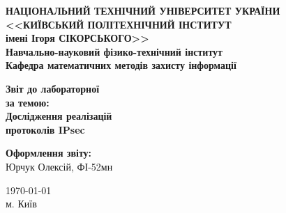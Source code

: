 \thispagestyle{empty}
\linespread{1.1}

\begin{center}
    {\bfseries\large
        НАЦІОНАЛЬНИЙ ТЕХНІЧНИЙ УНІВЕРСИТЕТ УКРАЇНИ \\
        <<КИЇВСЬКИЙ ПОЛІТЕХНІЧНИЙ ІНСТИТУТ \\
        імені Ігоря СІКОРСЬКОГО>> \\
        Навчально-науковий фізико-технічний інститут \\
        \medskip
        Кафедра математичних методів захисту інформації}
\end{center}

\begin{center}
\vspace{40mm}
{\bfseries\huge Звіт до лабораторної } \\
{\bfseries\Large за темою:} \\
{\bfseries\Large Дослідження реалізацій} \\
{\bfseries\Large протоколів IPsec} \\
\end{center}

\vspace{55mm}
\begin{center}
    \hfill
    \begin{minipage}[t]{0.4\textwidth}
        \begin{flushright}
            \textbf{Оформлення звіту:} \\
                Юрчук Олексій, ФІ-52мн \\
        \end{flushright}
    \end{minipage}
\end{center}

\vfill
\begin{center}
    \today \\
    {м. Київ}
\end{center}

\newpage
{}
